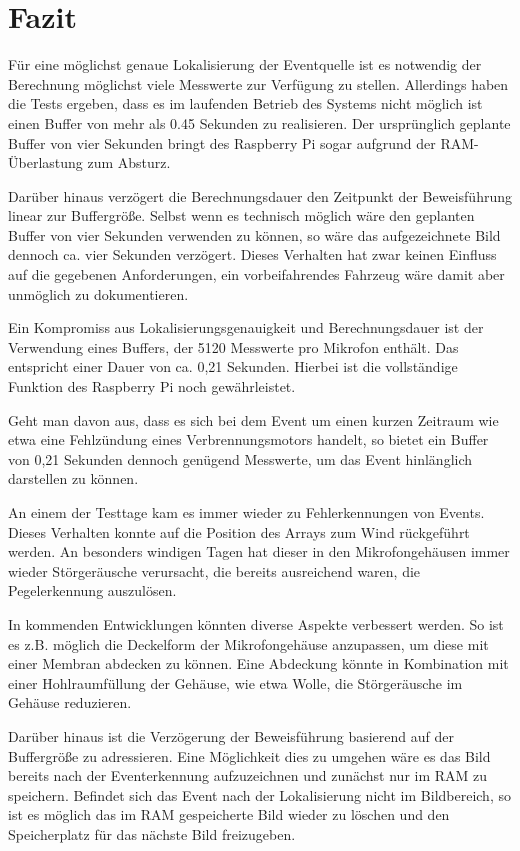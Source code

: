 \section{Fazit}

Für eine möglichst genaue Lokalisierung der Eventquelle ist es notwendig der Berechnung möglichst viele Messwerte zur Verfügung zu stellen. Allerdings haben die Tests ergeben, dass es im laufenden Betrieb des Systems nicht möglich ist einen Buffer von mehr als 0.45 Sekunden zu realisieren. Der ursprünglich geplante Buffer von vier Sekunden bringt des Raspberry Pi sogar aufgrund der RAM-Überlastung zum Absturz.

Darüber hinaus verzögert die Berechnungsdauer den Zeitpunkt der Beweisführung linear zur Buffergröße. Selbst wenn es technisch möglich wäre den geplanten Buffer von vier Sekunden verwenden zu können, so wäre das aufgezeichnete Bild dennoch ca. vier Sekunden verzögert. Dieses Verhalten hat zwar keinen Einfluss auf die gegebenen Anforderungen, ein vorbeifahrendes Fahrzeug wäre damit aber unmöglich zu dokumentieren. 

Ein Kompromiss aus Lokalisierungsgenauigkeit und Berechnungsdauer ist der Verwendung eines Buffers, der 5120 Messwerte pro Mikrofon enthält. Das entspricht einer Dauer von ca. 0,21 Sekunden. Hierbei ist die vollständige Funktion des Raspberry Pi noch gewährleistet. 

Geht man davon aus, dass es sich bei dem Event um einen kurzen Zeitraum wie etwa eine Fehlzündung eines Verbrennungsmotors handelt, so bietet ein Buffer von 0,21 Sekunden dennoch genügend Messwerte, um das Event hinlänglich darstellen zu können. 

An einem der Testtage kam es immer wieder zu Fehlerkennungen von Events. Dieses Verhalten konnte auf die Position des Arrays zum Wind rückgeführt werden. An besonders windigen Tagen hat dieser in den Mikrofongehäusen immer wieder Störgeräusche verursacht, die bereits ausreichend waren, die Pegelerkennung auszulösen. 

In kommenden Entwicklungen könnten diverse Aspekte verbessert werden. So ist es z.B. möglich die Deckelform der Mikrofongehäuse anzupassen, um diese mit einer Membran abdecken zu können. Eine Abdeckung könnte in Kombination mit einer Hohlraumfüllung der Gehäuse, wie etwa Wolle, die Störgeräusche im Gehäuse reduzieren. 

Darüber hinaus ist die Verzögerung der Beweisführung basierend auf der Buffergröße zu adressieren. Eine Möglichkeit dies zu umgehen wäre es das Bild bereits nach der Eventerkennung aufzuzeichnen und zunächst nur im RAM zu speichern. Befindet sich das Event nach der Lokalisierung nicht im Bildbereich, so ist es möglich das im RAM gespeicherte Bild wieder zu löschen und den Speicherplatz für das nächste Bild freizugeben. 

